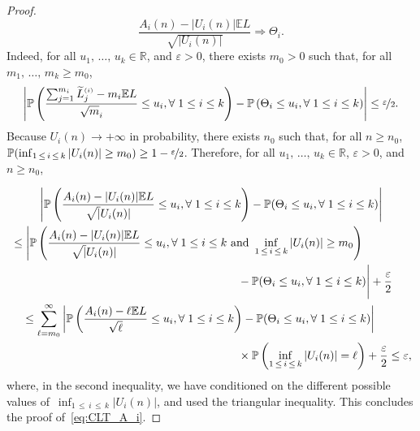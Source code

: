 \documentclass[AHL,Unicode,longabstracts,published]{cedram}
\newcommand{\sss}{\ensuremath{\scriptscriptstyle}}
\newcommand{\bbP}{\mathbb{P}}
\newcommand{\bbE}{\mathbb{E}}
\newcommand{\bbR}{\mathbb{R}}
\let\oldforall\forall
\renewcommand*{\forall}{\mathrel{\oldforall}}
\begin{document}
\begin{proof}
\begin{equation}
\frac{A_i(n)-|U_i(n)|\bbE L}{\sqrt{|U_i(n)|}}
\Rightarrow \Theta_i.
\end{equation}
Indeed, for all $u_1,\,\ldots,\, u_k\in\bbR$, and $\varepsilon>0$, there exists $m_0>0$ such that, for all $m_1, \,\ldots,\, m_k\geq m_0$,
\[
\left|\bbP\left(\frac{\sum_{j=1}^{m_i} \widetilde L^{\sss (i)}_j - m_i\bbE L}{\sqrt m_i}\leq u_i, \forall 1\leq i\leq k\right) - \bbP\left(\Theta_i\leq u_i, \forall 1\leq i\leq k\right)\right|\leq \nicefrac\varepsilon2.
\]
Because $U_i(n)\to+\infty$ in probability, there exists $n_0$ such that, for all $n\geq n_0$, $\bbP(\inf_{1\,\leq\,i\,\leq\,k} |U_i(n)|\geq m_0) \geq 1-\nicefrac\varepsilon2$. Therefore, for all $u_1, \,\ldots,\, u_k\in\bbR$, $\varepsilon>0$, and $n\geq n_0$,

\begin{multline*}
\left|\bbP\left(\frac{A_i(n) - |U_i(n)|\bbE L}{\sqrt |U_i(n)|}\leq u_i, \forall 1\leq i\leq k\right) - \bbP(\Theta_i\leq u_i, \forall 1\leq i\leq k)\right|\\
\begin{aligned}
&\leq \Bigg|\bbP\left(\frac{A_i(n) - |U_i(n)|\bbE L}{\sqrt |U_i(n)|}\leq u_i, \forall 1\leq i\leq k \text{ and }\inf_{1\,\leq\,i\,\leq \,k}|U_i(n)|\geq m_0\right) \\
&\hskip20em - \bbP(\Theta_i\leq u_i, \forall 1\leq i\leq k)\Bigg| + \frac\varepsilon2\\
&\quad \leq \sum_{\ell = m_0}^\infty \left|\bbP\left(\frac{A_i(n) - \ell\bbE L}{\sqrt \ell}\leq u_i, \forall 1\leq i\leq k\right) - \bbP(\Theta_i\leq u_i, \forall 1\leq i\leq k)\right| \\
&\hskip20em\times\bbP\left(\inf_{1\,\leq\,i\,\leq\,k}|U_i(n)|=\ell\right) + \frac\varepsilon2\leq \varepsilon,
\end{aligned}
\end{multline*}
where, in the second inequality, we have conditioned on the different possible values of~$\inf_{1\,\leq\,i\,\leq\,k}|U_i(n)|$, and used the triangular inequality. This concludes the proof of~\eqref{eq:CLT_A_i}.


\end{proof}
\end{document}
